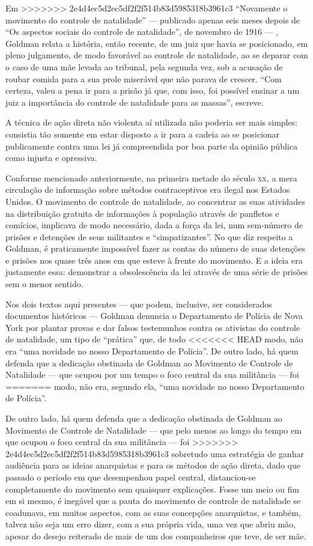 Em
>>>>>>> 2e4d4ec5d2ec5df2f2f514b83d5985318b3961c3
``Novamente o movimento do controle de natalidade'' --- publicado apenas
seis meses depois de ``Os aspectos sociais do controle de natalidade'', de
novembro de 1916 --- , Goldman relata a história, então recente, de um
juiz que havia se posicionado, em pleno julgamento, de modo favorável ao
controle de natalidade, ao se deparar com o caso de uma mãe levada ao
tribunal, pela segunda vez, sob a acusação de roubar comida para a sua
prole miserável que não parava de crescer. ``Com certeza, valeu a pena
ir para a prisão já que, com isso, foi possível ensinar a um juiz a
importância do controle de natalidade para as massas'', escreve.

A técnica de ação direta não violenta aí utilizada não
poderia ser mais simples: consistia tão somente em estar disposto a ir
para a cadeia ao se posicionar publicamente contra uma lei já
compreendida por boa parte da opinião pública como injusta e opressiva.

Conforme mencionado anteriormente, na primeira metade do século \textsc{xx}, a
mera circulação de informação sobre métodos contraceptivos era
ilegal nos Estados Unidos. O movimento de controle de
natalidade, ao concentrar as suas atividades na distribuição gratuita de
informações à população através de panfletos e comícios, implicava de
modo necessário, dada a força da lei, num sem-número de prisões e
detenções de seus militantes e ``simpatizantes''. No que diz
respeito a Goldman, é praticamente impossível fazer as contas do número
de suas detenções e prisões nos quase três anos em que esteve à frente
do movimento. E a ideia era justamente essa: demonstrar a obsolescência
da lei através de uma série de prisões sem o menor sentido.

Nos dois textos aqui presentes --- que podem, inclusive, ser considerados
documentos históricos --- Goldman denuncia o Departamento de Polícia de
Nova York por plantar provas e dar falsos testemunhos contra os
ativistas do controle de natalidade, um tipo de ``prática'' que, de todo
<<<<<<< HEAD
modo, não era ``uma novidade no nosso Departamento de
Polícia''. De outro lado, há quem defenda que a dedicação obstinada de
Goldman ao Movimento de Controle de Natalidade --- que ocupou por um tempo
o foco central da sua militância --- foi
=======
modo, não era, segundo ela, ``uma novidade no nosso Departamento de
Polícia''. 

De outro lado, há quem defenda que a dedicação obstinada de
Goldman ao Movimento de Controle de Natalidade --- que pelo menos ao
longo do tempo em que ocupou o foco central da sua militância --- foi
>>>>>>> 2e4d4ec5d2ec5df2f2f514b83d5985318b3961c3
sobretudo uma estratégia de ganhar audiência para as ideias anarquistas
e para os métodos de ação direta, dado que passado o período em que
desempenhou papel central, distanciou-se completamente do movimento sem
quaisquer explicações. Fosse um meio ou fim em si mesmo, é inegável que
a pauta do movimento de controle de natalidade se coadunava, em muitos
aspectos, com as suas concepções anarquistas, e também, talvez não seja
um erro dizer, com a sua própria vida, uma vez que abriu mão, apesar do
desejo reiterado de mais de um dos companheiros que teve, de ser mãe.

